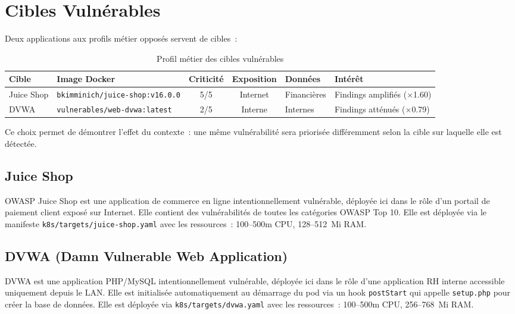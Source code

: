 \documentclass[12pt,a4paper]{report}
\begin{document}
\section{Cibles Vulnérables}
Deux applications aux profils métier opposés servent de cibles~:

\begin{table}[H]
\centering
\caption{Profil métier des cibles vulnérables}
\small
\begin{tabularx}{\textwidth}{L{1.9cm} L{3.4cm} c c L{2.2cm} X}
\toprule
\textbf{Cible} & \textbf{Image Docker} & \textbf{Criticité} & \textbf{Exposition} & \textbf{Données} & \textbf{Intérêt} \\
\midrule
Juice Shop & \texttt{bkimminich/\allowbreak juice-shop:\allowbreak v16.0.0} & 5/5 & Internet & Financières & Findings amplifiés ($\times$1.60) \\
DVWA       & \texttt{vulnerables/\allowbreak web-dvwa:\allowbreak latest}    & 2/5 & Interne  & Internes    & Findings atténués ($\times$0.79) \\
\bottomrule
\end{tabularx}
\end{table}

Ce choix permet de démontrer l'effet du contexte~: une même vulnérabilité sera priorisée différemment selon la cible sur laquelle elle est détectée.

\subsection{Juice Shop}
OWASP Juice Shop est une application de commerce en ligne intentionnellement vulnérable, déployée ici dans le rôle d'un portail de paiement client exposé sur Internet. Elle contient des vulnérabilités de toutes les catégories OWASP Top 10. Elle est déployée via le manifeste \texttt{k8s/targets/juice-shop.yaml} avec les ressources~: 100--500m CPU, 128--512~Mi RAM.

\subsection{DVWA (Damn Vulnerable Web Application)}
DVWA est une application PHP/MySQL intentionnellement vulnérable, déployée ici dans le rôle d'une application RH interne accessible uniquement depuis le LAN. Elle est initialisée automatiquement au démarrage du pod via un hook \texttt{postStart} qui appelle \texttt{setup.php} pour créer la base de données. Elle est déployée via \texttt{k8s/targets/dvwa.yaml} avec les ressources~: 100--500m CPU, 256--768~Mi RAM.
\end{document}

